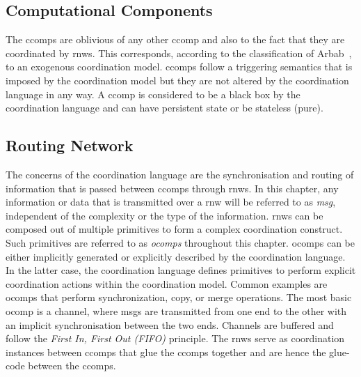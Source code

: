 \subsection{Computational Components}
\label{sect_smx_model_ccomp}
The \glspl*{ccomp} are oblivious of any other \gls*{ccomp} and also to the fact that they are coordinated by \glspl*{rnw}.
This corresponds, according to the classification of Arbab~\cite{arbab1998}, to an exogenous coordination model.
\Glspl*{ccomp} follow a triggering semantics that is imposed by the coordination model but they are not altered by the coordination language in any way.
A \gls*{ccomp} is considered to be a black box by the coordination language and can have persistent state or be stateless (pure).

\subsection{Routing Network}
\label{sect_smx_model_rnw}
The concerns of the coordination language are the synchronisation and routing of information that is passed between \glspl*{ccomp} through \glspl*{rnw}.
In this chapter, any information or data that is transmitted over a \gls*{rnw} will be referred to as \emph{\gls*{msg}}, independent of the complexity or the type of the information.
\Glspl*{rnw} can be composed out of multiple primitives to form a complex coordination construct.
Such primitives are referred to as \emph{\glspl*{ocomp}} throughout this chapter.
\Glspl*{ocomp} can be either implicitly generated or explicitly described by the coordination language.
In the latter case, the coordination language defines primitives to perform explicit coordination actions within the coordination model.
Common examples are \glspl*{ocomp} that perform synchronization, copy, or merge operations.
The most basic \gls*{ocomp} is a channel, where \glspl*{msg} are transmitted from one end to the other with an implicit synchronisation between the two ends.
Channels are buffered and follow the \emph{First In, First Out (FIFO)} principle.
The \glspl*{rnw} serve as coordination instances between \glspl*{ccomp} that glue the \glspl*{ccomp} together and are hence the glue-code between the \glspl*{ccomp}.

